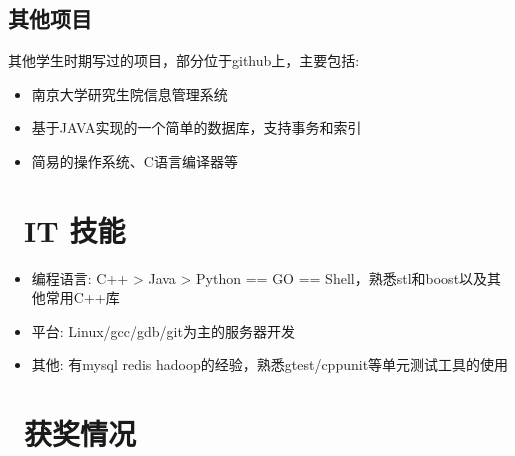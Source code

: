 \documentclass{resume}
\begin{document}
\subsection{\textbf{其他项目}}
其他学生时期写过的项目，部分位于github上，主要包括:
\begin{itemize}
  \item 南京大学研究生院信息管理系统
  \item 基于JAVA实现的一个简单的数据库，支持事务和索引
  \item 简易的操作系统、C语言编译器等
\end{itemize}

\section{\faCogs\ IT 技能}
\begin{itemize}[parsep=0.5ex]
  \item 编程语言: C++ > Java > Python == GO == Shell，熟悉stl和boost以及其他常用C++库
  \item 平台: Linux/gcc/gdb/git为主的服务器开发
  \item 其他: 有mysql redis hadoop的经验，熟悉gtest/cppunit等单元测试工具的使用
\end{itemize}

\section{\faHeartO\ 获奖情况}
\end{document}
